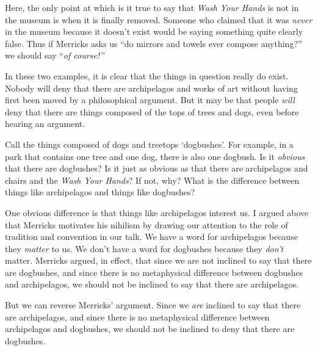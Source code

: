 \documentclass[11pt]{article}
\begin{document}
\begin{spacing}{1.25}
Here, the only point at which is it true to say that {\em Wash Your
  Hands} is not in the museum is when it is finally removed.  Someone
who claimed that it was {\em never} in the museum because it doesn't
exist would be saying something quite clearly false.  Thus if Merricks
asks us ``do mirrors and towels ever compose anything?'' we should say
``{\em of course!}\,''

In these two examples, it is clear that the things in question really
do exist.  Nobody will deny that there are archipelagos and works of
art without having first been moved by a philosophical argument.  But
it may be that people {\em will} deny that there are things composed
of the tops of trees and dogs, even before hearing an argument.

Call the things composed of dogs and treetops `dogbushes'.  For
example, in a park that contains one tree and one dog, there is also
one dogbush.  Is it {\em obvious} that there are dogbushes?  Is it
just as obvious as that there are archipelagos and chairs and the {\em
  Wash Your Hands}?  If not, why?  What is the difference between
things like archipelagos and things like dogbushes?

One obvious difference is that things like archipelagos interest us.
I argued above that Merricks motivates his nihilism by drawing our
attention to the role of tradition and convention in our talk.  We
have a word for archipelagos because they {\em matter} to us.  We
don't have a word for dogbushes because they {\em don't} matter.
Merricks argued, in effect, that since we are not inclined to say that
there are dogbushes, and since there is no metaphysical difference
between dogbushes and archipelagos, we should not be inclined to say
that there are archipelagos.

But we can reverse Merricks' argument.  Since we {\em are} inclined to
say that there are archipelagos, and since there is no metaphysical
difference between archipelagos and dogbushes, we should not be
inclined to deny that there are dogbushes.


\end{spacing}
\end{document}
